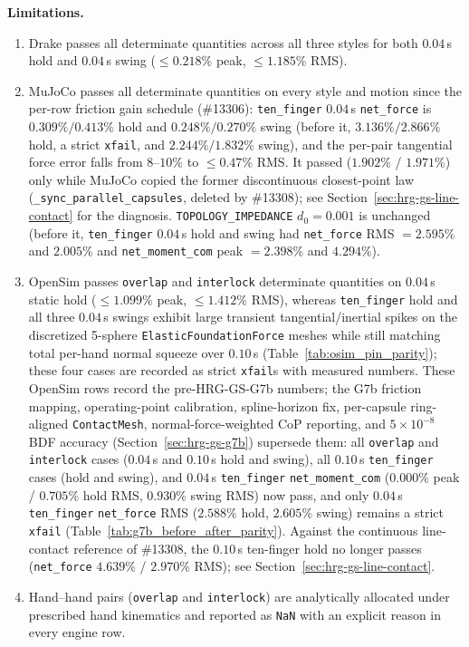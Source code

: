 \documentclass[11pt,a4paper]{article}
\begin{document}
\textbf{Limitations.}
\begin{enumerate}[leftmargin=*,noitemsep]
\item Drake passes all determinate quantities across all three styles for both $0.04$\,s hold and $0.04$\,s swing ($\le 0.218\%$ peak, $\le 1.185\%$ RMS).
\item MuJoCo passes all determinate quantities on every style and motion since the per-row friction gain schedule (\#13306): \texttt{ten\_finger} $0.04$\,s \texttt{net\_force} is $0.309\% / 0.413\%$ hold and $0.248\% / 0.270\%$ swing (before it, $3.136\% / 2.866\%$ hold, a strict \texttt{xfail}, and $2.244\% / 1.832\%$ swing), and the per-pair tangential force error falls from $8$--$10\%$ to $\le 0.47\%$ RMS. It passed ($1.902\%$ / $1.971\%$) only while MuJoCo copied the former discontinuous closest-point law (\texttt{\_sync\_parallel\_capsules}, deleted by \#13308); see Section~\ref{sec:hrg-gs-line-contact} for the diagnosis. \texttt{TOPOLOGY\_IMPEDANCE} $d_0 = 0.001$ is unchanged (before it, \texttt{ten\_finger} $0.04$\,s hold and swing had \texttt{net\_force} RMS $= 2.595\%$ and $2.005\%$ and \texttt{net\_moment\_com} peak $= 2.398\%$ and $4.294\%$).
\item OpenSim passes \texttt{overlap} and \texttt{interlock} determinate quantities on $0.04$\,s static hold ($\le 1.099\%$ peak, $\le 1.412\%$ RMS), whereas \texttt{ten\_finger} hold and all three $0.04$\,s swings exhibit large transient tangential/inertial spikes on the discretized 5-sphere \texttt{ElasticFoundationForce} meshes while still matching total per-hand normal squeeze over $0.10$\,s (Table~\ref{tab:osim_pin_parity}); these four cases are recorded as strict \texttt{xfail}s with measured numbers. These OpenSim rows record the pre-HRG-GS-G7b numbers; the G7b friction mapping, operating-point calibration, spline-horizon fix, per-capsule ring-aligned \texttt{ContactMesh}, normal-force-weighted CoP reporting, and $5\times 10^{-8}$ BDF accuracy (Section~\ref{sec:hrg-gs-g7b}) supersede them: all \texttt{overlap} and \texttt{interlock} cases ($0.04$\,s and $0.10$\,s hold and swing), all $0.10$\,s \texttt{ten\_finger} cases (hold and swing), and $0.04$\,s \texttt{ten\_finger} \texttt{net\_moment\_com} ($0.000\%$ peak / $0.705\%$ hold RMS, $0.930\%$ swing RMS) now pass, and only $0.04$\,s \texttt{ten\_finger} \texttt{net\_force} RMS ($2.588\%$ hold, $2.605\%$ swing) remains a strict \texttt{xfail} (Table~\ref{tab:g7b_before_after_parity}). Against the continuous line-contact reference of \#13308, the $0.10$\,s ten-finger hold no longer passes (\texttt{net\_force} $4.639\%$ / $2.970\%$ RMS); see Section~\ref{sec:hrg-gs-line-contact}.
\item Hand--hand pairs (\texttt{overlap} and \texttt{interlock}) are analytically allocated under prescribed hand kinematics and reported as \texttt{NaN} with an explicit reason in every engine row.
\end{enumerate}
\end{document}
